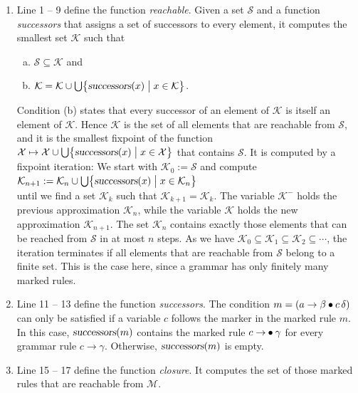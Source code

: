 \begin{enumerate}
\item Line 1 -- 9 define the function \textsl{reachable}.  Given a set \(\mathcal{S}\) and a function
      \textsl{successors} that assigns a set of successors to every element, it computes the smallest set
      \(\mathcal{K}\) such that
      \begin{enumerate}[(a)]
      \item \(\mathcal{S} \subseteq \mathcal{K}\) and
      \item \(\mathcal{K} = \mathcal{K} \cup \bigcup \bigl\{ \textsl{successors}(x) \bigm| x \in \mathcal{K} \bigr\}\).
      \end{enumerate}
      Condition (b) states that every successor of an element of \(\mathcal{K}\) is itself an element of
      \(\mathcal{K}\).  Hence \(\mathcal{K}\) is the set of all elements that are reachable from \(\mathcal{S}\),
      and it is the smallest fixpoint of the function
      \(\mathcal{X} \mapsto \mathcal{X} \cup \bigcup \bigl\{ \textsl{successors}(x) \bigm| x \in \mathcal{X} \bigr\}\)
      that contains \(\mathcal{S}\).  It is computed by a fixpoint iteration:  We start with
      \(\mathcal{K}_0 := \mathcal{S}\) and compute
      \\[0.2cm]
      \hspace*{1.3cm}
      \(\mathcal{K}_{n+1} := \mathcal{K}_n \cup \bigcup \bigl\{ \textsl{successors}(x) \bigm| x \in \mathcal{K}_n \bigr\}\)
      \\[0.2cm]
      until we find a set \(\mathcal{K}_k\) such that \(\mathcal{K}_{k+1} = \mathcal{K}_k\).  The variable
      \(\mathcal{K}^-\) holds the previous approximation \(\mathcal{K}_n\), while the variable \(\mathcal{K}\) holds
      the new approximation \(\mathcal{K}_{n+1}\).  The set \(\mathcal{K}_n\) contains exactly those elements that
      can be reached from \(\mathcal{S}\) in at most \(n\) steps.  As we have
      \(\mathcal{K}_0 \subseteq \mathcal{K}_1 \subseteq \mathcal{K}_2 \subseteq \cdots\), the iteration terminates
      if all elements that are reachable from \(\mathcal{S}\) belong to a finite set.  This is the case here,
      since a grammar has only finitely many marked rules.
\item Line 11 -- 13 define the function \textsl{successors}.  The condition
      \(m = (a\rightarrow\beta\mdot{}c\,\delta)\) can only be satisfied if a variable \(c\) follows the marker in
      the marked rule \(m\).  In this case, \(\textsl{successors}(m)\) contains the marked rule
      \(c \rightarrow \mdot \gamma\) for every grammar rule \(c \rightarrow \gamma\).  Otherwise,
      \(\textsl{successors}(m)\) is empty.
\item Line 15 -- 17 define the function \textsl{closure}.  It computes the set of those marked rules that are
      reachable from \(\mathcal{M}\).
\end{enumerate}

